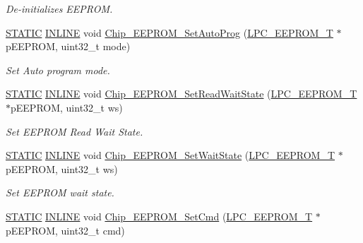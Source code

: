 \begin{DoxyCompactItemize}
\begin{DoxyCompactList}\small\item\em De-\/initializes E\+E\+P\+R\+OM. \end{DoxyCompactList}\item 
\hyperlink{group___l_p_c___types___public___macros_ga10b2d890d871e1489bb02b7e70d9bdfb}{S\+T\+A\+T\+IC} \hyperlink{spifi__18xx__43xx_8h_a2eb6f9e0395b47b8d5e3eeae4fe0c116}{I\+N\+L\+I\+NE} void \hyperlink{group___e_e_p_r_o_m__18_x_x__43_x_x_ga7a562f00e3404a06569a4b7c61ade80f}{Chip\+\_\+\+E\+E\+P\+R\+O\+M\+\_\+\+Set\+Auto\+Prog} (\hyperlink{struct_l_p_c___e_e_p_r_o_m___t}{L\+P\+C\+\_\+\+E\+E\+P\+R\+O\+M\+\_\+T} $\ast$p\+E\+E\+P\+R\+OM, uint32\+\_\+t mode)
\begin{DoxyCompactList}\small\item\em Set Auto program mode. \end{DoxyCompactList}\item 
\hyperlink{group___l_p_c___types___public___macros_ga10b2d890d871e1489bb02b7e70d9bdfb}{S\+T\+A\+T\+IC} \hyperlink{spifi__18xx__43xx_8h_a2eb6f9e0395b47b8d5e3eeae4fe0c116}{I\+N\+L\+I\+NE} void \hyperlink{group___e_e_p_r_o_m__18_x_x__43_x_x_gaebadf781a37193e0cc84746da5c96b12}{Chip\+\_\+\+E\+E\+P\+R\+O\+M\+\_\+\+Set\+Read\+Wait\+State} (\hyperlink{struct_l_p_c___e_e_p_r_o_m___t}{L\+P\+C\+\_\+\+E\+E\+P\+R\+O\+M\+\_\+T} $\ast$p\+E\+E\+P\+R\+OM, uint32\+\_\+t ws)
\begin{DoxyCompactList}\small\item\em Set E\+E\+P\+R\+OM Read Wait State. \end{DoxyCompactList}\item 
\hyperlink{group___l_p_c___types___public___macros_ga10b2d890d871e1489bb02b7e70d9bdfb}{S\+T\+A\+T\+IC} \hyperlink{spifi__18xx__43xx_8h_a2eb6f9e0395b47b8d5e3eeae4fe0c116}{I\+N\+L\+I\+NE} void \hyperlink{group___e_e_p_r_o_m__18_x_x__43_x_x_ga2288ea4bc7ca2c7802c0880e5e347952}{Chip\+\_\+\+E\+E\+P\+R\+O\+M\+\_\+\+Set\+Wait\+State} (\hyperlink{struct_l_p_c___e_e_p_r_o_m___t}{L\+P\+C\+\_\+\+E\+E\+P\+R\+O\+M\+\_\+T} $\ast$p\+E\+E\+P\+R\+OM, uint32\+\_\+t ws)
\begin{DoxyCompactList}\small\item\em Set E\+E\+P\+R\+OM wait state. \end{DoxyCompactList}\item 
\hyperlink{group___l_p_c___types___public___macros_ga10b2d890d871e1489bb02b7e70d9bdfb}{S\+T\+A\+T\+IC} \hyperlink{spifi__18xx__43xx_8h_a2eb6f9e0395b47b8d5e3eeae4fe0c116}{I\+N\+L\+I\+NE} void \hyperlink{group___e_e_p_r_o_m__18_x_x__43_x_x_gaf8f467bf5d3c7141bbad5244a15a889e}{Chip\+\_\+\+E\+E\+P\+R\+O\+M\+\_\+\+Set\+Cmd} (\hyperlink{struct_l_p_c___e_e_p_r_o_m___t}{L\+P\+C\+\_\+\+E\+E\+P\+R\+O\+M\+\_\+T} $\ast$p\+E\+E\+P\+R\+OM, uint32\+\_\+t cmd)

\end{DoxyCompactItemize}
